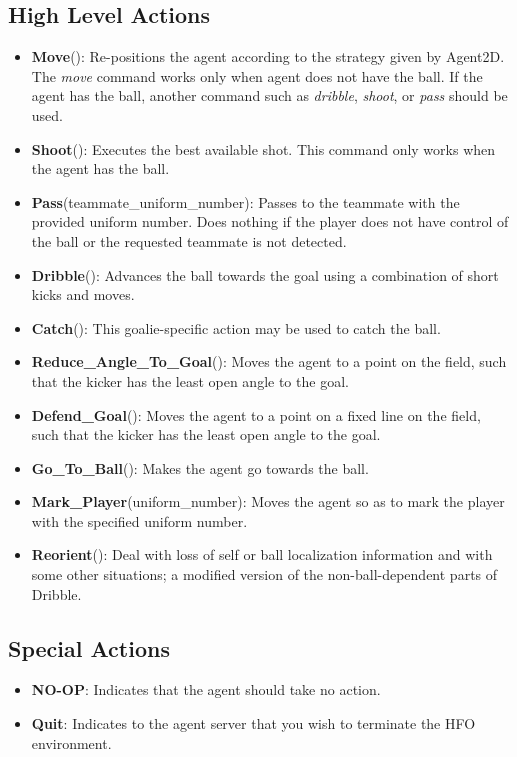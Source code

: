 \documentclass[12pt]{article}
\begin{document}
\subsection{High Level Actions}
\label{sec:high_level_actions}
\begin{itemize}[noitemsep]
\item{\textbf{Move}(): Re-positions the agent according to the
  strategy given by Agent2D. The \textit{move} command works only when
  agent does not have the ball. If the agent has the ball, another
  command such as \textit{dribble}, \textit{shoot}, or \textit{pass}
  should be used.}
\item{\textbf{Shoot}(): Executes the best available shot. This command
  only works when the agent has the ball.}
\item{\textbf{Pass}(teammate\_uniform\_number): Passes to the teammate
  with the provided uniform number. Does nothing if the player does
  not have control of the ball or the requested teammate is not
  detected.}
\item{\textbf{Dribble}(): Advances the ball towards the goal using a
  combination of short kicks and moves.}
\item{\textbf{Catch}(): This goalie-specific action may be used to
  catch the ball.}
\item{\textbf{Reduce\_Angle\_To\_Goal}(): Moves the agent to a point on the field,
	such that the kicker has the least open angle to the goal. }
\item{\textbf{Defend\_Goal}(): Moves the agent to a point on a fixed line on the field,
	such that the kicker has the least open angle to the goal.}
\item{\textbf{Go\_To\_Ball}(): Makes the agent go towards the ball.}
\item{\textbf{Mark\_Player}(uniform\_number): Moves the agent so as to mark the player
	with the specified uniform number.}
\item{\textbf{Reorient}(): Deal with loss of self or ball localization information and with
        some other situations; a modified version of the non-ball-dependent parts of Dribble.}

\end{itemize}

\subsection{Special Actions}
\begin{itemize}[noitemsep]
\item{\textbf{NO-OP}: Indicates that the agent should take no action.}
\item{\textbf{Quit}: Indicates to the agent server that you wish to
  terminate the HFO environment.}
\end{itemize}
\end{document}
